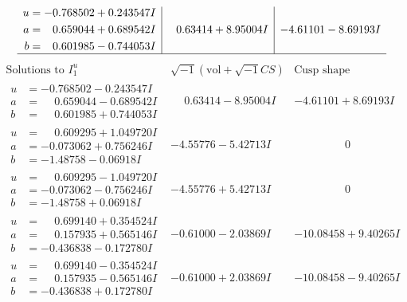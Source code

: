 \documentclass[1p]{elsarticle_modified}
\theoremstyle{definition}
\newcommand{\I}{\sqrt{-1}}
\begin{document}
$$\begin{array}{c|c|c}
\begin{aligned}
u &= -0.768502 + 0.243547 I \\
a &= \phantom{-}0.659044 + 0.689542 I \\
b &= \phantom{-}0.601985 - 0.744053 I\end{aligned}
 & \phantom{-}0.63414 + 8.95004 I & -4.61101 - 8.69193 I\\
 \hline 
 \end{array}$$\newpage$$\begin{array}{c|c|c}  
\text{Solutions to }I^u_{1}& \I (\text{vol} + \sqrt{-1}CS) & \text{Cusp shape}\\
 \hline 
\begin{aligned}
u &= -0.768502 - 0.243547 I \\
a &= \phantom{-}0.659044 - 0.689542 I \\
b &= \phantom{-}0.601985 + 0.744053 I\end{aligned}
 & \phantom{-}0.63414 - 8.95004 I & -4.61101 + 8.69193 I \\ \hline\begin{aligned}
u &= \phantom{-}0.609295 + 1.049720 I \\
a &= -0.073062 + 0.756246 I \\
b &= -1.48758 - 0.06918 I\end{aligned}
 & -4.55776 - 5.42713 I & \phantom{-0.000000 } 0 \\ \hline\begin{aligned}
u &= \phantom{-}0.609295 - 1.049720 I \\
a &= -0.073062 - 0.756246 I \\
b &= -1.48758 + 0.06918 I\end{aligned}
 & -4.55776 + 5.42713 I & \phantom{-0.000000 } 0 \\ \hline\begin{aligned}
u &= \phantom{-}0.699140 + 0.354524 I \\
a &= \phantom{-}0.157935 + 0.565146 I \\
b &= -0.436838 - 0.172780 I\end{aligned}
 & -0.61000 - 2.03869 I & -10.08458 + 9.40265 I \\ \hline\begin{aligned}
u &= \phantom{-}0.699140 - 0.354524 I \\
a &= \phantom{-}0.157935 - 0.565146 I \\
b &= -0.436838 + 0.172780 I\end{aligned}
 & -0.61000 + 2.03869 I & -10.08458 - 9.40265 I \\ \hline\begin{aligned}

\end{aligned}
\end{array}$$
\end{document}
